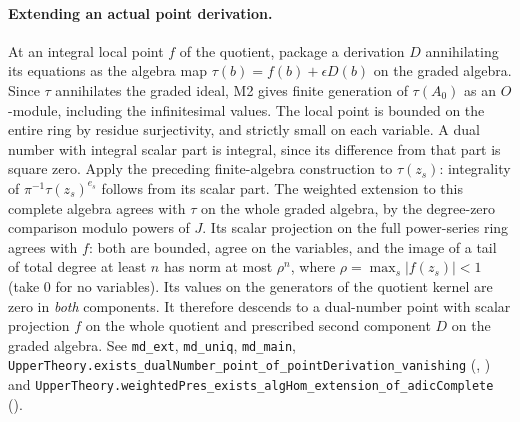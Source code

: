\paragraph{Extending an actual point derivation.}
At an integral local point $f$ of the quotient, package a derivation
$D$ annihilating its equations as the algebra map
$\tau(b)=f(b)+\epsilon D(b)$ on the graded algebra. Since $\tau$
annihilates the graded ideal, M2 gives finite generation of
$\tau(A_0)$ as an $O$-module, including the infinitesimal values.
The local point is bounded on the entire ring by residue surjectivity,
and strictly small on each variable. A dual number with integral scalar
part is integral, since its difference from that part is square zero.
Apply the preceding finite-algebra construction to $\tau(z_s)$:
integrality of $\pi^{-1}\tau(z_s)^{e_s}$ follows from its scalar part.
The weighted extension to this complete algebra agrees with $\tau$ on
the whole graded algebra, by the degree-zero comparison modulo powers
of $J$. Its scalar projection on the full power-series ring agrees
with $f$: both are bounded, agree on the variables, and the image of a
tail of total degree at least $n$ has norm at most $\rho^n$, where
$\rho=\max_s|f(z_s)|<1$ (take $0$ for no variables). Its values on the
generators of the quotient kernel are zero in \emph{both} components.
It therefore descends to a dual-number point with scalar projection $f$
on the whole quotient and prescribed second component $D$ on the graded
algebra. See \nolinkurl{md_ext}, \nolinkurl{md_uniq}, \nolinkurl{md_main},
\nolinkurl{UpperTheory.exists_dualNumber_point_of_pointDerivation_vanishing}
(,
)
and \nolinkurl{UpperTheory.weightedPres_exists_algHom_extension_of_adicComplete}
().

